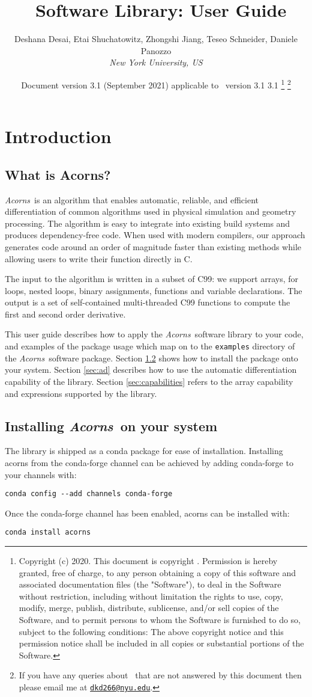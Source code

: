 \documentclass[a4,oneside]{book}
\title{\Acorns\ Software Library: User Guide}
\author{Deshana Desai, Etai Shuchatowitz, Zhongshi Jiang, Teseo Schneider, Daniele Panozzo\\ \emph{New York University, US}\\ }
\date{Document version 3.1 (September 2021) applicable to \Acorns\ version 3.1
  3.1 \thanks{Copyright (c) 2020. This document is copyright .  Permission is hereby granted, free of charge, to any person obtaining a copy of this software and associated documentation files (the "Software"), to deal in the Software without restriction, including without limitation the rights to use, copy, modify, merge, publish, distribute, sublicense, and/or sell copies of the Software, and to permit persons to whom the Software is furnished to do so, subject to the following conditions: 
  The above copyright notice and this permission notice shall be included in all copies or substantial portions of the Software.}
  \thanks{If you have any queries about \Acorns\ that are not answered
    by this document then please
    email me at
    \href{mailto:dkd266@nyu.edu}{\texttt{dkd266@nyu.edu}}.}}
\def\codesize{\small}
\def\Acorns{\emph{Acorns}}
\def\code#1{{\codesize\texttt{#1}}}
\renewcommand\thefootnote{\relax}
\begin{document}
\maketitle
\def\thefootnote{\fnsymbol{footnote}}

\chapter{Introduction}
\section{What is Acorns?}
\Acorns\ is an algorithm that enables automatic, reliable, and efficient differentiation of common algorithms used in physical
simulation and geometry processing. The algorithm is easy to integrate into existing build systems and produces dependency-free code. When used with modern compilers, our approach generates code around an order of magnitude faster than existing methods while allowing users to write their function directly in C.

The input to the algorithm is written in a subset of C99: we support arrays, for loops, nested loops, binary assignments, functions and variable declarations. The output is a set of self-contained multi-threaded C99 functions to compute the first and second order derivative.

This user guide describes how to apply the \Acorns\ software library to your code, and examples of the package usage which map on to the \code{examples} directory of the \Acorns\ software package. Section \ref{sec:installing} shows how to install the package onto your system. Section \ref{sec:ad} describes how to use the automatic differentiation capability of the library. Section \ref{sec:capabilities} refers to the array capability and expressions supported by the library. 

\section{Installing \Acorns\ on your system}
\label{sec:installing}

The library is shipped as a conda package for ease of installation. Installing acorns from the conda-forge channel can be achieved by adding conda-forge to your channels with: \newline
\begin{lstlisting}
conda config --add channels conda-forge
\end{lstlisting}
Once the conda-forge channel has been enabled, acorns can be installed with:\newline
\begin{lstlisting}
conda install acorns
\end{lstlisting}
\end{document}
